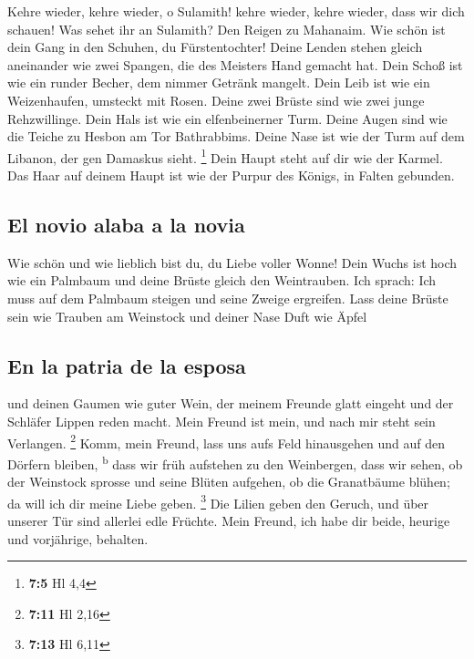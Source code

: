  Kehre wieder, kehre wieder, o Sulamith! kehre wieder,
kehre wieder, dass wir dich schauen! Was sehet ihr an Sulamith? Den
Reigen zu Mahanaim.  Wie schön ist dein Gang in den
Schuhen, du Fürstentochter! Deine Lenden stehen gleich aneinander wie
zwei Spangen, die des Meisters Hand gemacht hat.  Dein
Schoß ist wie ein runder Becher, dem nimmer Getränk mangelt. Dein Leib
ist wie ein Weizenhaufen, umsteckt mit Rosen.  Deine zwei
Brüste sind wie zwei junge Rehzwillinge.  Dein Hals ist
wie ein elfenbeinerner Turm. Deine Augen sind wie die Teiche zu Hesbon
am Tor Bathrabbims. Deine Nase ist wie der Turm auf dem Libanon, der gen
Damaskus sieht. \footnote{\textbf{7:5} Hl 4,4}  Dein Haupt
steht auf dir wie der Karmel. Das Haar auf deinem Haupt ist wie der
Purpur des Königs, in Falten gebunden.

\hypertarget{el-novio-alaba-a-la-novia}{%
\subsection{El novio alaba a la novia}\label{el-novio-alaba-a-la-novia}}

 Wie schön und wie lieblich bist du, du Liebe voller
Wonne!  Dein Wuchs ist hoch wie ein Palmbaum und deine
Brüste gleich den Weintrauben.  Ich sprach: Ich muss auf
dem Palmbaum steigen und seine Zweige ergreifen. Lass deine Brüste sein
wie Trauben am Weinstock und deiner Nase Duft wie Äpfel

\hypertarget{en-la-patria-de-la-esposa}{%
\subsection{En la patria de la esposa}\label{en-la-patria-de-la-esposa}}

 und deinen Gaumen wie guter Wein, der meinem Freunde
glatt eingeht und der Schläfer Lippen reden macht.  Mein
Freund ist mein, und nach mir steht sein Verlangen. \footnote{\textbf{7:11}
  Hl 2,16}  Komm, mein Freund, lass uns aufs Feld
hinausgehen und auf den Dörfern bleiben, \textsuperscript{b}
 dass wir früh aufstehen zu den Weinbergen, dass wir
sehen, ob der Weinstock sprosse und seine Blüten aufgehen, ob die
Granatbäume blühen; da will ich dir meine Liebe geben. \footnote{\textbf{7:13}
  Hl 6,11}  Die Lilien geben den Geruch, und über unserer
Tür sind allerlei edle Früchte. Mein Freund, ich habe dir beide, heurige
und vorjährige, behalten.

